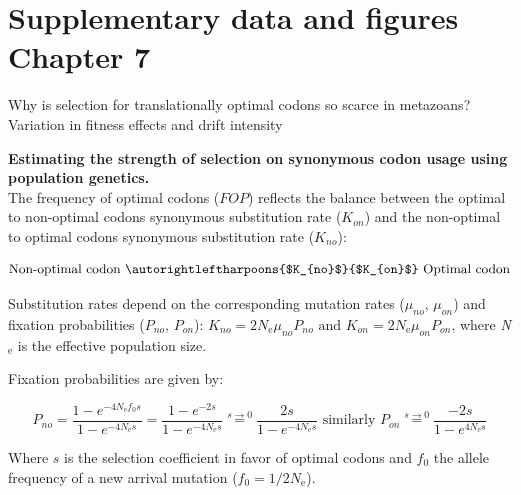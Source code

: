 

\chapter{Supplementary data and figures Chapter 7}\raggedleft\textcolor{BLUEROYAL}{\LARGE{Why is selection for translationally optimal codons so scarce in metazoans?}}\\
\raggedleft\textcolor{BLUEROYAL}{\Large{Variation in fitness effects and drift intensity}}

{\hypersetup{linkcolor=GREYDARK}\minilof\newpage}

\graphicspath{{chap7-Translational Selection/figures/}}

\raggedright
\textbf{Estimating the strength of selection on synonymous codon usage using population genetics.}
\\
The frequency of optimal codons ($FOP$) reflects the balance between the optimal to non-optimal codons synonymous substitution rate ($K_{on}$) and the non-optimal to optimal codons synonymous substitution rate ($K_{no}$):

\[\text{Non-optimal codon } \autorightleftharpoons{$K_{no}$}{$K_{on}$} \text{ Optimal codon}\]

Substitution rates depend on the corresponding mutation rates ($\mu_{no}$, $\mu_{on}$) and fixation probabilities ($P_{no}$, $P_{on}$): \(K_{no} = 2\textit{N}_{\text{e}} \mu_{no} P_{no}\text{    and    }K_{on} = 2\textit{N}_{\text{e}} \mu_{on} P_{on}\), where \textit{N}$_{\text{e}}$ is the effective population size.

Fixation probabilities are given by:

\[P_{no} =  \frac{1 - e^{-4 \textit{N}_{\text{e}} f_0 s }}{1 - e^{-4 \textit{N}_{\text{e}} s }} = \frac{1 - e^{-2 s }}{1 - e^{-4 \textit{N}_{\text{e}} s }} \stackrel{\text{$s \rightarrow 0$}}{=} \frac{2 s }{1 - e^{-4 \textit{N}_{\text{e}} s }} \text{ similarly } P_{on} \stackrel{\text{$s \rightarrow 0$}}{=} \frac{-2 s }{1 - e^{4 \textit{N}_{\text{e}} s }}  \]



Where $s$ is the selection coefficient in favor of optimal codons and $f_0$ the allele frequency of a new arrival mutation ($f_0 = 1/2\textit{N}_{\text{e}}$).

